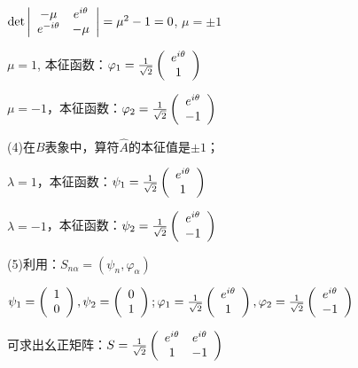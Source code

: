 $\det \left| {\begin{array}{*{20}c}
   { - \mu } & {e^{i\theta } }  \\
   {e^{ - i\theta } } & { - \mu }  \\
\end{array}} \right| = \mu ^2  - 1 = 0$, $\mu  =  \pm 1$

$\mu  = 1$, 本征函数：$\varphi _1  = \frac{1}{{\sqrt 2 }}\left( {\begin{array}{*{20}c}
   {e^{i\theta } }  \\
   1  \\
\end{array}} \right)$

$\mu  = - 1$，本征函数：$\varphi _2  = \frac{1}{{\sqrt 2 }}\left( {\begin{array}{*{20}c}
   {e^{i\theta } }  \\
   { - 1}  \\
\end{array}} \right)$

(4)在$B$表象中，算符$\hat A$的本征值是$ \pm 1$；


$\lambda = 1$，本征函数：$\psi _1  = \frac{1}{{\sqrt 2 }}\left( {\begin{array}{*{20}c}
   {e^{i\theta } }  \\
   1  \\
\end{array}} \right)$

$\lambda = - 1$，本征函数：$\psi _2  = \frac{1}{{\sqrt 2 }}\left( {\begin{array}{*{20}c}
   {e^{i\theta } }  \\
   { - 1}  \\
\end{array}} \right)$



(5)利用：$S_{n\alpha }  = \left( {\psi _n ,\varphi _\alpha  } \right)$

$\psi _1  = \left( {\begin{array}{*{20}c}
   1  \\
   0  \\
\end{array}} \right),\psi _2  = \left( {\begin{array}{*{20}c}
   0  \\
   1  \\
\end{array}} \right);\varphi _1  = \frac{1}{{\sqrt 2 }}\left( {\begin{array}{*{20}c}
   {e^{i\theta } }  \\
   1  \\
\end{array}} \right),\varphi _2  = \frac{1}{{\sqrt 2 }}\left( {\begin{array}{*{20}c}
   {e^{i\theta } }  \\
   { - 1}  \\
\end{array}} \right)$

可求出幺正矩阵：$S = \frac{1}{{\sqrt 2 }}\left( {\begin{array}{*{20}c}
   {e^{i\theta } } & {e^{i\theta } }  \\
   1 & { - 1}  \\
\end{array}} \right)$
